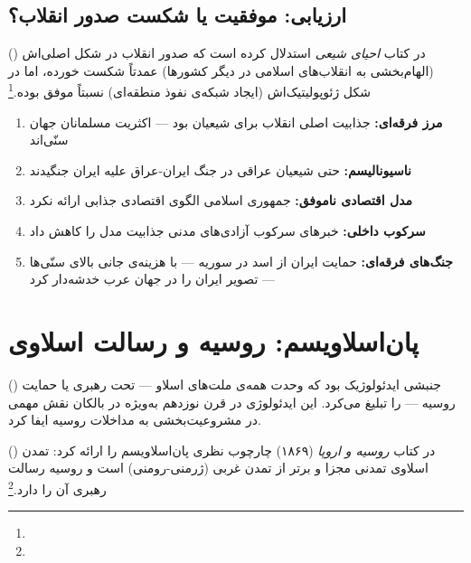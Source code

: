 \subsection{ارزیابی: موفقیت یا شکست صدور انقلاب؟}
\label{subsec:ch13-export-assessment}

 () در کتاب \textit{احیای شیعی} استدلال کرده است که صدور انقلاب در شکل اصلی‌اش (الهام‌بخشی به انقلاب‌های اسلامی در دیگر کشورها) عمدتاً شکست خورده، اما در شکل ژئوپولیتیک‌اش (ایجاد شبکه‌ی نفوذ منطقه‌ای) نسبتاً موفق بوده.\footnote{}

\begin{tcolorbox}[failbox, title={محدودیت‌های صدور انقلاب اسلامی}]
\begin{enumerate}
\item \textbf{مرز فرقه‌ای:} جذابیت اصلی انقلاب برای شیعیان بود — اکثریت مسلمانان جهان سنّی‌اند
\item \textbf{ناسیونالیسم:} حتی شیعیان عراقی در جنگ ایران-عراق علیه ایران جنگیدند
\item \textbf{مدل اقتصادی ناموفق:} جمهوری اسلامی الگوی اقتصادی جذابی ارائه نکرد
\item \textbf{سرکوب داخلی:} خبرهای سرکوب آزادی‌های مدنی جذابیت مدل را کاهش داد
\item \textbf{جنگ‌های فرقه‌ای:} حمایت ایران از اسد در سوریه — با هزینه‌ی جانی بالای سنّی‌ها — تصویر ایران را در جهان عرب خدشه‌دار کرد
\end{enumerate}
\end{tcolorbox}


\section{پان‌اسلاویسم: روسیه و رسالت اسلاوی}
\label{sec:ch13-panslavism}

 () جنبشی ایدئولوژیک بود که وحدت همه‌ی ملت‌های اسلاو — تحت رهبری یا حمایت روسیه — را تبلیغ می‌کرد. این ایدئولوژی در قرن نوزدهم به‌ویژه در بالکان نقش مهمی در مشروعیت‌بخشی به مداخلات روسیه ایفا کرد.

 () در کتاب \textit{روسیه و اروپا} (۱۸۶۹) چارچوب نظری پان‌اسلاویسم را ارائه کرد: تمدن اسلاوی تمدنی مجزا و برتر از تمدن غربی (ژرمنی-رومنی) است و روسیه رسالت رهبری آن را دارد.\footnote{}

